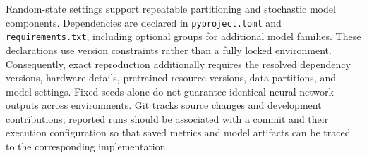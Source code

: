 Random-state settings support repeatable partitioning and stochastic model components. Dependencies are declared in \texttt{pyproject.toml} and \texttt{requirements.txt}, including optional groups for additional model families. These declarations use version constraints rather than a fully locked environment. Consequently, exact reproduction additionally requires the resolved dependency versions, hardware details, pretrained resource versions, data partitions, and model settings. Fixed seeds alone do not guarantee identical neural-network outputs across environments. Git tracks source changes and development contributions; reported runs should be associated with a commit and their execution configuration so that saved metrics and model artifacts can be traced to the corresponding implementation.
